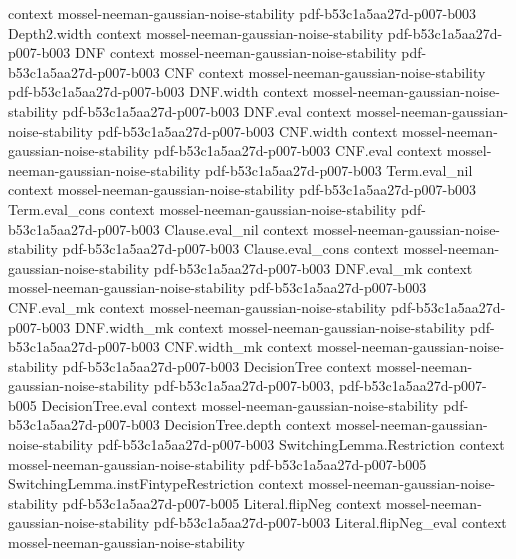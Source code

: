 \begin{theorem}
  {context}
  {mossel-neeman-gaussian-noise-stability}
  {pdf-b53c1a5aa27d-p007-b003}
\proofstep
  {Depth2.width}
  {context}
  {mossel-neeman-gaussian-noise-stability}
  {pdf-b53c1a5aa27d-p007-b003}
\proofstep
  {DNF}
  {context}
  {mossel-neeman-gaussian-noise-stability}
  {pdf-b53c1a5aa27d-p007-b003}
\proofstep
  {CNF}
  {context}
  {mossel-neeman-gaussian-noise-stability}
  {pdf-b53c1a5aa27d-p007-b003}
\proofstep
  {DNF.width}
  {context}
  {mossel-neeman-gaussian-noise-stability}
  {pdf-b53c1a5aa27d-p007-b003}
\proofstep
  {DNF.eval}
  {context}
  {mossel-neeman-gaussian-noise-stability}
  {pdf-b53c1a5aa27d-p007-b003}
\proofstep
  {CNF.width}
  {context}
  {mossel-neeman-gaussian-noise-stability}
  {pdf-b53c1a5aa27d-p007-b003}
\proofstep
  {CNF.eval}
  {context}
  {mossel-neeman-gaussian-noise-stability}
  {pdf-b53c1a5aa27d-p007-b003}
\proofstep
  {Term.eval_nil}
  {context}
  {mossel-neeman-gaussian-noise-stability}
  {pdf-b53c1a5aa27d-p007-b003}
\proofstep
  {Term.eval_cons}
  {context}
  {mossel-neeman-gaussian-noise-stability}
  {pdf-b53c1a5aa27d-p007-b003}
\proofstep
  {Clause.eval_nil}
  {context}
  {mossel-neeman-gaussian-noise-stability}
  {pdf-b53c1a5aa27d-p007-b003}
\proofstep
  {Clause.eval_cons}
  {context}
  {mossel-neeman-gaussian-noise-stability}
  {pdf-b53c1a5aa27d-p007-b003}
\proofstep
  {DNF.eval_mk}
  {context}
  {mossel-neeman-gaussian-noise-stability}
  {pdf-b53c1a5aa27d-p007-b003}
\proofstep
  {CNF.eval_mk}
  {context}
  {mossel-neeman-gaussian-noise-stability}
  {pdf-b53c1a5aa27d-p007-b003}
\proofstep
  {DNF.width_mk}
  {context}
  {mossel-neeman-gaussian-noise-stability}
  {pdf-b53c1a5aa27d-p007-b003}
\proofstep
  {CNF.width_mk}
  {context}
  {mossel-neeman-gaussian-noise-stability}
  {pdf-b53c1a5aa27d-p007-b003}
\proofstep
  {DecisionTree}
  {context}
  {mossel-neeman-gaussian-noise-stability}
  {pdf-b53c1a5aa27d-p007-b003,
    pdf-b53c1a5aa27d-p007-b005}
\proofstep
  {DecisionTree.eval}
  {context}
  {mossel-neeman-gaussian-noise-stability}
  {pdf-b53c1a5aa27d-p007-b003}
\proofstep
  {DecisionTree.depth}
  {context}
  {mossel-neeman-gaussian-noise-stability}
  {pdf-b53c1a5aa27d-p007-b003}
\proofstep
  {SwitchingLemma.Restriction}
  {context}
  {mossel-neeman-gaussian-noise-stability}
  {pdf-b53c1a5aa27d-p007-b005}
\proofstep
  {SwitchingLemma.instFintypeRestriction}
  {context}
  {mossel-neeman-gaussian-noise-stability}
  {pdf-b53c1a5aa27d-p007-b005}
\proofstep
  {Literal.flipNeg}
  {context}
  {mossel-neeman-gaussian-noise-stability}
  {pdf-b53c1a5aa27d-p007-b003}
\proofstep
  {Literal.flipNeg_eval}
  {context}
  {mossel-neeman-gaussian-noise-stability}

\end{theorem}
